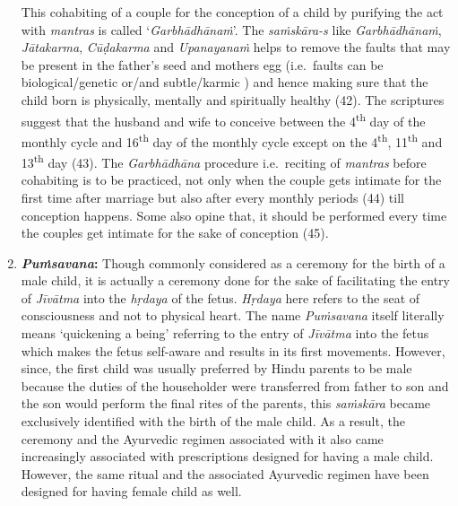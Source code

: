 \begin{enumerate}
  This cohabiting of a couple for the conception of a child by purifying the act with \emph{mantras} is called `\emph{Garbhādhānaṁ}'. The \emph{saṁskāra-s} like \emph{Garbhādhānaṁ}, \emph{Jātakarma}, \emph{Cūḍakarma} and \emph{Upanayanaṁ} helps to remove the faults that may be present in the father's seed and mothers egg (i.e.\ faults can be biological/genetic or/and subtle/karmic ) and hence making sure that the child born is physically, mentally and spiritually healthy (42). The scriptures suggest that the husband and wife to conceive between the 4\textsuperscript{th} day of the monthly cycle and 16\textsuperscript{th} day of the monthly cycle except on the 4\textsuperscript{th}, 11\textsuperscript{th} and 13\textsuperscript{th} day (43). The \emph{Garbhādhāna} procedure i.e.\ reciting of \emph{mantras} before cohabiting is to be practiced, not only when the couple gets intimate for the first time after marriage but also after every monthly periods (44) till conception happens. Some also opine that, it should be performed every time the couples get intimate for the sake of conception (45).
\item
  \textbf{\emph{Puṁsavana}:} Though commonly considered as a ceremony for the birth of a male child, it is actually a ceremony done for the sake of facilitating the entry of \emph{Jīvātma} into the \emph{hṛdaya} of the fetus. \emph{Hṛdaya} here refers to the seat of consciousness and not to physical heart. The name \emph{Puṁsavana} itself literally means `quickening a being' referring to the entry of \emph{Jīvātma} into the fetus which makes the fetus self-aware and results in its first movements. However, since, the first child was usually preferred by Hindu parents to be male because the duties of the householder were transferred from father to son and the son would perform the final rites of the parents, this \emph{saṁskāra} became exclusively identified with the birth of the male child. As a result, the ceremony and the Ayurvedic regimen associated with it also came increasingly associated with prescriptions designed for having a male child. However, the same ritual and the associated Ayurvedic regimen have been designed for having female child as well.


\end{enumerate}
